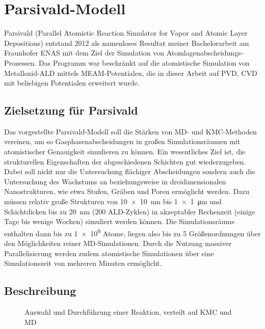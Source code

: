 \section{Parsivald-Modell}
\label{parsivald}

Parsivald (Parallel Atomistic Reaction Simulator for Vapor and Atomic Layer Depositions) entstand 2012 als namenloses Resultat meiner Bachelorarbeit\cite{lorenz_entwicklung_2012} am Fraunhofer ENAS mit dem Ziel der Simulation von Atom\-lagen\-abscheidungs-Prozessen.
Das Programm war beschränkt auf die atomistische Simulation von Metall\-oxid-ALD mittels MEAM-Potentialen, die in dieser Arbeit auf PVD, CVD mit beliebigen Potentialen erweitert wurde.

\subsection{Zielsetzung für Parsivald}

Das vorgestellte Parsivald-Modell soll die Stärken von MD- und KMC-Methoden vereinen, um so Gasphasenabscheidungen in großen Simulationsräumen mit atomistischer Genauigkeit simulieren zu können.
Ein wesentliches Ziel ist, die strukturellen Eigenschaften der abgeschiedenen Schichten gut wiederzugeben.
Dabei soll nicht nur die Untersuchung flächiger Abscheidungen sondern auch die Untersuchung des Wachstums an beziehungsweise in dreidimensionalen Nanostrukturen, wie etwa Stufen, Gräben und Poren ermöglicht werden.
Dazu müssen relativ große Strukturen von \SI{10x10}{\nano\meter} bis \SI{1x1}{\micro\meter} und Schichtdicken bis zu \SI{20}{\nano\meter} (\num{200} ALD-Zyklen) in akzeptabler Rechenzeit (einige Tage bis wenige Wochen) simuliert werden können.
Die Simulationsräume enthalten dann bis zu \num{1e9} Atome, liegen also bis zu \num{5} Größenordnungen über den Möglichkeiten reiner MD-Simulationen.
Durch die Nutzung massiver Parallelisierung werden zudem atomistische Simulationen über eine Simulationszeit von mehreren Minuten ermöglicht.

\subsection{Beschreibung}

\begin{figure}[b]
  \centering
  \def\svgwidth{\textwidth}
  
  \caption{Auswahl und Durchführung einer Reaktion, verteilt auf KMC und MD}
  \label{fig:parsivald-schema}
\end{figure}

